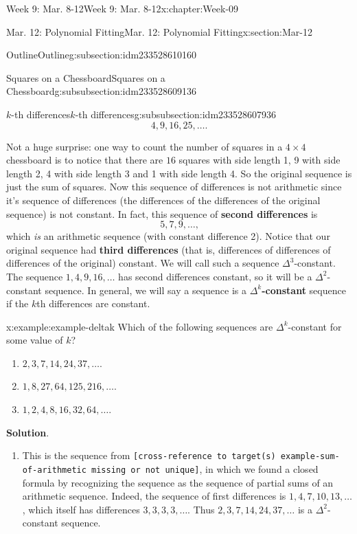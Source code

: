 \documentclass[oneside,10pt,]{book}
\newcommand{\blocktitlefont}{\relax}
\newcommand{\mono}[1]{\texttt{#1}}
\newcommand{\terminology}[1]{\textbf{#1}}
\numberwithin{equation}{section}
\begin{document}
\begin{chapterptx}{Week 9: Mar. 8-12}{}{Week 9: Mar. 8-12}{}{}{x:chapter:Week-09}
\begin{sectionptx}{Mar. 12: Polynomial Fitting}{}{Mar. 12: Polynomial Fitting}{}{}{x:section:Mar-12}
\begin{subsectionptx}{Outline}{}{Outline}{}{}{g:subsection:idm233528610160}
\begin{subsubsectionptx}{Squares on a Chessboard}{}{Squares on a Chessboard}{}{}{g:subsubsection:idm233528609136}
\begin{subsubsectionptx}{\(k\)-th differences}{}{\(k\)-th differences}{}{}{g:subsubsection:idm233528607936}
\begin{equation*}
4, 9, 16, 25, \ldots\text{.}
\end{equation*}
%
\par
Not a huge surprise: one way to count the number of squares in a \(4 \times 4\) chessboard is to notice that there are \(16\) squares with side length 1, 9 with side length 2, 4 with side length 3 and 1 with side length 4. So the original sequence is just the sum of squares. Now this sequence of differences is not arithmetic since it's sequence of differences (the differences of the differences of the original sequence) is not constant. In fact, this sequence of \terminology{second differences} is %
\begin{equation*}
5, 7, 9, \ldots\text{,}
\end{equation*}
which \emph{is} an arithmetic sequence (with constant difference 2). Notice that our original sequence had \terminology{third differences} (that is, differences of differences of differences of the original) constant. We will call such a sequence \(\Delta^3\)-constant. The sequence \(1, 4, 9, 16, \ldots\) has second differences constant, so it will be a \(\Delta^2\)-constant sequence. In general, we will say a sequence is a \terminology{\(\Delta^k\)-constant} \label{g:notation:idm233528589872} sequence if the \(k\)th differences are constant.%
\begin{example}{}{x:example:example-deltak}%
Which of the following sequences are \(\Delta^k\)-constant for some value of \(k\)?%
\begin{enumerate}
\item{}\(2, 3, 7, 14, 24, 37,\ldots\).%
\item{}\(1, 8, 27, 64, 125, 216, \ldots\).%
\item{}\(1,2,4,8,16,32,64,\ldots\).%
\end{enumerate}
%
\par\smallskip%
\noindent\textbf{\blocktitlefont Solution}.\hypertarget{p:solution:vrl}{}\quad{}%
\begin{enumerate}
\item{}This is the sequence from \mono{[cross-reference to target(s) \textquotedbl{}example-sum-of-arithmetic\textquotedbl{} missing or not unique]}, in which we found a closed formula by recognizing the sequence as the sequence of partial sums of an arithmetic sequence. Indeed, the sequence of first differences is \(1,4,7, 10, 13,\ldots\), which itself has differences \(3,3,3,3,\ldots\). Thus \(2, 3, 7, 14, 24, 37,\ldots\) is a \(\Delta^2\)-constant sequence.%

\end{enumerate}
\end{example}
\end{subsubsectionptx}
\end{subsubsectionptx}
\end{subsectionptx}
\end{sectionptx}
\end{chapterptx}
\end{document}
